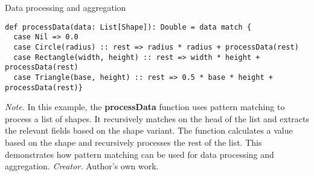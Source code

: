 \begin{table}[h!]
\caption{Data processing and aggregation}
\begin{lstlisting}
def processData(data: List[Shape]): Double = data match {
  case Nil => 0.0
  case Circle(radius) :: rest => radius * radius + processData(rest)
  case Rectangle(width, height) :: rest => width * height + processData(rest)
  case Triangle(base, height) :: rest => 0.5 * base * height + processData(rest)}
\end{lstlisting}
\small
\textit{Note.} In this example, the \textbf{processData} function uses pattern matching to process a list of shapes. It recursively matches on the head of the list and extracts the relevant fields based on the shape variant. The function calculates a value based on the shape and recursively processes the rest of the list. This demonstrates how pattern matching can be used for data processing and aggregation.
\textit{Creator.} Author's own work.
\end{table}